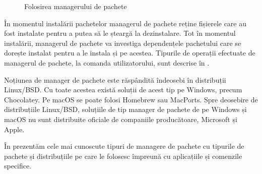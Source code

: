 \begin{figure}[htbp]
  \centering
  \def\svgwidth{\columnwidth}
  
  \caption{Folosirea managerului de pachete}
  \label{fig:package:manager}
\end{figure}

În momentul instalării pachetelor managerul de pachete reține fișierele care au fost instalate pentru a putea să le șteargă la dezinstalare. Tot în momentul instalării, managerul de pachete va investiga dependențele pachetului care se dorește instalat pentru a le instala și pe acestea. Tipurile de operații efectuate de managerul de pachete, la comanda utilizatorului, sunt descrise în .

Noțiunea de manager de pachete este răspândită îndeosebi în distribuții Linux/BSD. Cu toate acestea există soluții de acest tip pe Windows, precum Chocolatey. Pe macOS se poate folosi Homebrew sau MacPorts. Spre deosebire de distribuțiile Linux/BSD, soluțiile de tip manager de pachete de pe Windows și macOS nu sunt distribuite oficiale de companiile producătoare, Microsoft și Apple.

În  prezentăm cele mai cunoscute tipuri de managere de pachete cu tipurile de pachete și distribuțiile pe care le folosesc împreună cu aplicațiile și comenzile specifice.

